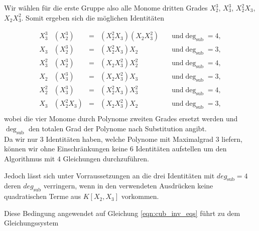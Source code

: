 \documentclass[a4paper,oneside, 11pt, openany%
]{article}
\theoremstyle{custom}
\theoremstyle{custom}
\begin{document}
	Wir wählen für die erste Gruppe also alle Monome dritten Grades $X_{2}^3$, $X_{3}^3$, $X_{2}^2X_{3}$, $X_{2}X_{3}^2$.
	Somit ergeben sich die möglichen Identitäten
	
	\begin{equation*}\label{eqn:4C3id}
		\begin{alignedat}{4}
			X_{3}^3&	\left( X_{2}^3\right)  &=& \left( X_{2}^2X_{3}\right) 	\left( X_{2}X_{3}^2\right)&\quad \text{und} \deg_{\text{sub}}=4, \\
			X_{3}&\left( X_{2}^3\right) &=&\left( X_{2}^2X_{3}\right) X_{2}&\quad\text{und} \deg_{\text{sub}}=3,\\
			X_{3}^2&	\left( X_{2}^3\right)  &=& \left(  X_{2}X_{3}^2\right) 	X_{2}^2&\quad\text{und} \deg_{\text{sub}}=4,\\
			X_{2}&	\left( X_{3}^3\right)  &=& \left( X_{2}X_{3}^2\right) 	X_{3}&\quad\text{und} \deg_{\text{sub}}=3,\\
			X_{2}^2&	\left( X_{3}^3\right)  &=& \left( X_{2}^2X_{3}\right) 	X_{3}^2&\quad\text{und} \deg_{\text{sub}}=4,\\
			X_{3}&	\left( X_{2}^2X_{3}\right)  &=& \left( X_{2}X_{3}^2\right) 	X_{2}&\quad\text{und} \deg_{\text{sub}}=3,\\
		\end{alignedat}
	\end{equation*}
	wobei die vier Monome durch Polynome zweiten Grades ersetzt werden und $\deg_{\text{sub}}$ den totalen Grad der Polynome nach Substitution angibt.\\
	
	Da wir nur 3 Identitäten haben, welche Polynome mit Maximalgrad $3$ liefern, können wir ohne Einschränkungen keine $6$ Identitäten aufstellen um den Algorithmus mit $4$ Gleichungen durchzuführen.
	
	Jedoch lässt sich unter Vorraussetzungen an die drei Identitäten mit $deg_\text{sub} = 4$ deren $deg_\text{sub}$ verringern, wenn in den verwendeten Ausdrücken keine quadratischen Terme aus $K[X_2,X_3]$ vorkommen.
	
	Diese Bedingung angewendet auf Gleichung \eqref{eqn:cub_inv_eqs} führt zu dem Gleichungssystem
	
\end{document}
